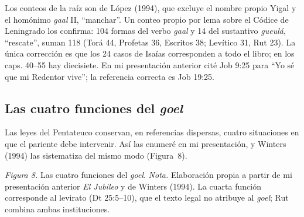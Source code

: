 \documentclass[11pt,letterpaper]{article}
\newcommand{\heb}[1]{\mbox{\foreignlanguage{hebrew}{#1}}}
\newcommand{\pie}[1]{\par{\footnotesize\color{sepia}#1\par}}
\begin{document}
\begin{nota}[Precisión]
Los conteos de la raíz son de López (1994), que excluye el nombre propio Yigal y el homónimo \emph{gaal} II, ``manchar''. Un conteo propio por lema sobre el Códice de Leningrado los confirma: 104 formas del verbo \emph{gaal} y 14 del sustantivo \emph{gueulá}, ``rescate'', suman 118 (Torá 44, Profetas 36, Escritos 38; Levítico 31, Rut 23). La única corrección es que los 24 casos de Isaías corresponden a todo el libro; en los caps. 40--55 hay diecisiete. En mi presentación anterior cité Job 9:25 para ``Yo sé que mi Redentor vive''; la referencia correcta es Job 19:25.
\end{nota}

\subsection{Las cuatro funciones del \emph{goel}}
Las leyes del Pentateuco conservan, en referencias dispersas, cuatro situaciones en que el pariente debe intervenir. Así las enumeré en mi presentación, y Winters (1994) las sistematiza del mismo modo (Figura~8).

\begin{center}\begin{minipage}{\linewidth}\centering
{}\par
\pie{\textit{Figura 8.} Las cuatro funciones del \emph{goel}. \textit{Nota.} Elaboración propia a partir de mi presentación anterior \emph{El Jubileo} y de Winters (1994). La cuarta función corresponde al levirato (Dt 25:5--10), que el texto legal no atribuye al \emph{goel}; Rut combina ambas instituciones.}
\end{minipage}\end{center}
\end{document}
